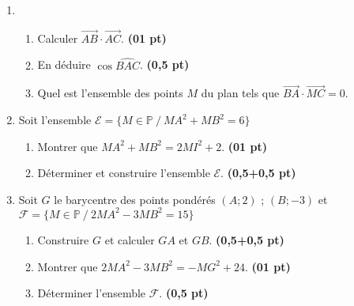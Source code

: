 \documentclass[12pt,a4paper]{article}
\begin{document}
\begin{enumerate}
    \item 
    \begin{enumerate}
        \item Calculer \( \overrightarrow{AB} \cdot \overrightarrow{AC} \). \hfill \textbf{(01 pt)}
        \item En déduire \( \cos \widehat{BAC} \). \hfill \textbf{(0,5 pt)}
        \item Quel est l'ensemble des points \( M \) du plan tels que \( \overrightarrow{BA} \cdot \overrightarrow{MC} = 0 \).
    \end{enumerate}
    
    \item Soit l'ensemble \( \mathcal{E} = \{ M \in \mathbb{P} \ / \ MA^2 + MB^2 = 6 \} \)
    \begin{enumerate}
        \item Montrer que \( MA^2 + MB^2 = 2MI^2 + 2 \). \hfill \textbf{(01 pt)}
        \item Déterminer et construire l'ensemble \( \mathcal{E} \). \hfill \textbf{(0,5+0,5 pt)}
    \end{enumerate}
    
    \item Soit \( G \) le barycentre des points pondérés \( (A ; 2) \) ; \( (B ; -3) \) et \( \mathcal{F} = \{ M \in \mathbb{P} \ / \ 2MA^2 - 3MB^2 = 15 \} \)
    \begin{enumerate}
        \item Construire \( G \) et calculer \( GA \) et \( GB \). \hfill \textbf{(0,5+0,5 pt)}
        \item Montrer que \( 2MA^2 - 3MB^2 = -MG^2 + 24 \). \hfill \textbf{(01 pt)}
        \item Déterminer l’ensemble \( \mathcal{F} \). \hfill \textbf{(0,5 pt)}
    \end{enumerate}
\end{enumerate}
\end{document}
